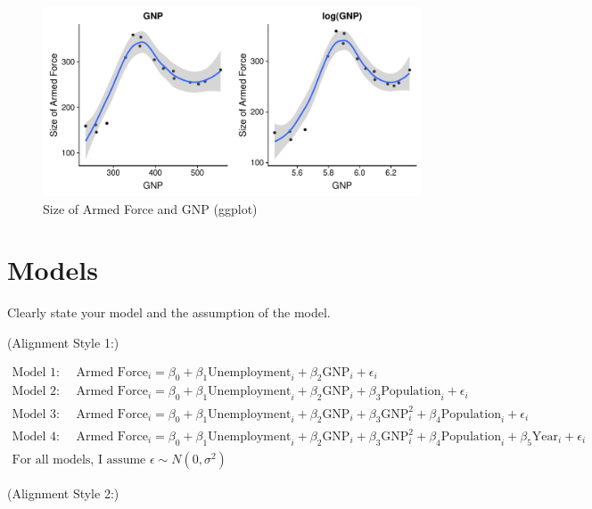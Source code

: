 \documentclass[11pt,]{article}
\begin{document}
\begin{figure}[h!]

{\centering \includegraphics[width=0.9\linewidth]{figures/cor2-1} 

}

\caption{\label{fig:force-and-gnp2}Size of Armed Force and GNP (ggplot)}\label{fig:cor2}
\end{figure}

\normalsize

\clearpage

\section{Models}\label{models}

Clearly state your model and the assumption of the model.

(Alignment Style 1:)

\begin{gather*}
  \text{Model 1: } \quad \text{Armed Force}_i = \beta_0 + \beta_1 \text{Unemployment}_i + \beta_2 \text{GNP}_i + \epsilon_i \\
  \text{Model 2: } \quad \text{Armed Force}_i = \beta_0 + \beta_1 \text{Unemployment}_i + \beta_2 \text{GNP}_i + \beta_3 \text{Population}_i + \epsilon_i \\
  \text{Model 3: } \quad \text{Armed Force}_i = \beta_0 + \beta_1 \text{Unemployment}_i + \beta_2 \text{GNP}_i  + \beta_3 \text{GNP}_i^2 + \beta_4 \text{Population}_i + \epsilon_i \\
  \text{Model 4: } \quad \text{Armed Force}_i = \beta_0 + \beta_1 \text{Unemployment}_i + \beta_2 \text{GNP}_i  + \beta_3 \text{GNP}_i^2 + \beta_4 \text{Population}_i + \beta_5 \text{Year}_i + \epsilon_i \\
  \text{For all models, I assume }  \epsilon \sim N(0, \sigma^2)
\end{gather*}

(Alignment Style 2:)
\end{document}
